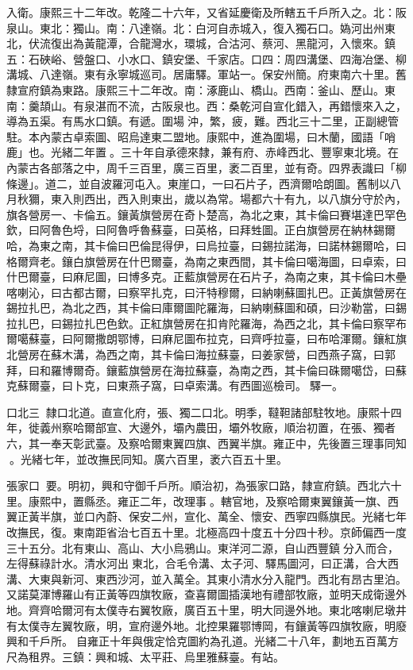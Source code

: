 \begin{pinyinscope}
入衛。康熙三十二年改。乾隆二十六年，又省延慶衛及所轄五千戶所入之。北：阪泉山。東北：獨山。南：八達嶺。北：白河自赤城入，復入獨石口。媯河出州東北，伏流復出為黃龍潭，合龍灣水，環城，合沽河、蔡河、黑龍河，入懷來。鎮五：石硤峪、營盤口、小水口、鎮安堡、千家店。口四：周四溝堡、四海冶堡、柳溝城、八達嶺。東有永寧城巡司。居庸驛。軍站一。保安州簡。府東南六十里。舊隸宣府鎮為東路。康熙三十二年改。南：涿鹿山、橋山。西南：釜山、歷山。東南：羹頡山。有泉湛而不流，古阪泉也。西：桑乾河自宣化錯入，再錯懷來入之，導為五渠。有馬水口鎮。有遞。圍場沖，繁，疲，難。西北三十二里，正副總管駐。本內蒙古卓索圖、昭烏達東二盟地。康熙中，進為圍場，曰木蘭，國語「哨鹿」也。光緒二年置。三十年自承德來隸，兼有府、赤峰西北、豐寧東北境。在內蒙古各部落之中，周千三百里，廣三百里，袤二百里，並有奇。四界表識曰「柳條邊」。道二，並自波羅河屯入。東崖口，一曰石片子，西濟爾哈朗圖。舊制以八月秋獮，東入則西出，西入則東出，歲以為常。場都六十有九，以八旗分守於內，旗各營房一、卡倫五。鑲黃旗營房在奇卜楚高，為北之東，其卡倫曰賽堪達巴罕色欽，曰阿魯色埒，曰阿魯呼魯蘇臺，曰英格，曰拜甡圖。正白旗營房在納林錫爾哈，為東之南，其卡倫曰巴倫昆得伊，曰烏拉臺，曰錫拉諾海，曰諾林錫爾哈，曰格爾齊老。鑲白旗營房在什巴爾臺，為南之東西間，其卡倫曰噶海圖，曰卓索，曰什巴爾臺，曰麻尼圖，曰博多克。正藍旗營房在石片子，為南之東，其卡倫曰木壘喀喇沁，曰古都古爾，曰察罕扎克，曰汗特穆爾，曰納喇蘇圖扎巴。正黃旗營房在錫拉扎巴，為北之西，其卡倫曰庫爾圖陀羅海，曰納喇蘇圖和碩，曰沙勒當，曰錫拉扎巴，曰錫拉扎巴色欽。正紅旗營房在扣肯陀羅海，為西之北，其卡倫曰察罕布爾噶蘇臺，曰阿爾撒朗鄂博，曰麻尼圖布拉克，曰齊呼拉臺，曰布哈渾爾。鑲紅旗北營房在蘇木溝，為西之南，其卡倫曰海拉蘇臺，曰姜家營，曰西燕子窩，曰郭拜，曰和羅博爾奇。鑲藍旗營房在海拉蘇臺，為南之西，其卡倫曰硃爾噶岱，曰蘇克蘇爾臺，曰卜克，曰東燕子窩，曰卓索溝。有西圖巡檢司。驛一。

口北三：隸口北道。直宣化府，張、獨二口北。明季，韃靼諸部駐牧地。康熙十四年，徙義州察哈爾部宣、大邊外，壩內農田，壩外牧廠，順治初置，在張、獨者六，其一奉天彰武臺。及察哈爾東翼四旗、西翼半旗。雍正中，先後置三理事同知。光緒七年，並改撫民同知。廣六百里，袤六百五十里。

張家口：要。明初，興和守御千戶所。順治初，為張家口路，隸宣府鎮。西北六十里。康熙中，置縣丞。雍正二年，改理事。轄官地，及察哈爾東翼鑲黃一旗、西翼正黃半旗，並口內蔚、保安二州，宣化、萬全、懷安、西寧四縣旗民。光緒七年改撫民，復。東南距省治七百五十里。北極高四十度五十分四十秒。京師偏西一度三十五分。北有東山、高山、大小烏鴉山。東洋河二源，自山西豐鎮分入而合，左得蘇祿計水。清水河出東北，合毛令溝、太子河、驛馬圖河，曰正溝，合大西溝、大東與新河、東西沙河，並入萬全。其東小清水分入龍門。西北有昂古里泊。又諾莫渾博羅山有正黃等四旗牧廠，查喜爾圖插漢地有禮部牧廠，並明天成衛邊外地。齊齊哈爾河有太僕寺右翼牧廠，廣百五十里，明大同邊外地。東北喀喇尼墩井有太僕寺左翼牧廠，明，宣府邊外地。北控果羅鄂博岡，有鑲黃等四旗牧廠，明廢興和千戶所。自雍正十年與俄定恰克圖約為孔道。光緒二十八年，劃地五百萬方尺為租界。三鎮：興和城、太平莊、烏里雅蘇臺。有站。


\end{pinyinscope}
